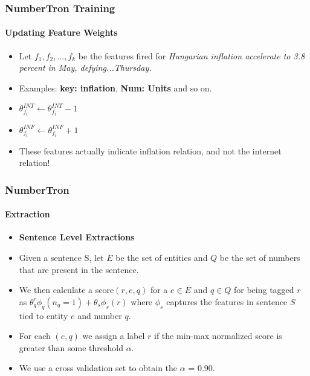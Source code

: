 \documentclass{beamer}
\begin{document}
\begin{frame}
\frametitle{NumberTron Training}
\framesubtitle{Updating Feature Weights}
\begin{itemize}
\setlength{\itemsep}{1em}
\item Let $f_1, f_2, ..., f_k$ be the features fired for \textit{Hungarian inflation  accelerate to 3.8 percent in May, defying...Thursday.}
\item Examples: \textbf{key: inflation}, \textbf{Num: Units} and so on.
\item $\theta_{f_i}^{INT} \gets \theta_{f_i}^{INT} - 1$
\item $\theta_{f_i}^{INF} \gets \theta_{f_i}^{INF} + 1$
\item These features actually indicate inflation relation, and not the internet relation!
\end{itemize}
\end{frame}


\begin{frame}
\frametitle{NumberTron}
\framesubtitle{Extraction}
\begin{itemize}
 \item \textbf{Sentence Level Extractions}
 
\item Given a sentence S, let $E$ be the set of entities and $Q$ be the set of numbers that are present in the sentence.  
\item We then calculate a score$(r,e,q)$ for a $e \in E$ and $q \in Q$ for being tagged $r$ as $\theta^r_q \phi_q(n_q=1) + \theta_s \phi_s(r)$
where $\phi_s$ captures the features in sentence $S$ tied to entity $e$ and number $q$.
\item For each $(e,q)$ we assign a label $r$ if the min-max normalized score is greater than some threshold $\alpha$.
\item We use a cross validation set to obtain the $\alpha$ = 0.90.
\end{itemize}

\end{frame}

\end{document}
